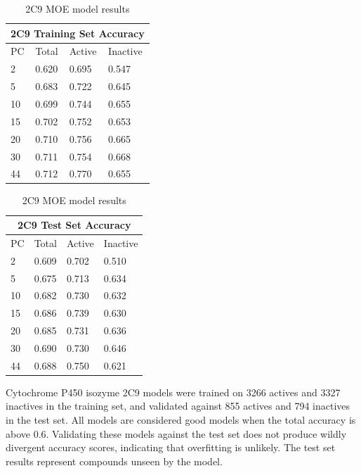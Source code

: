 \begin{table}[!h]
\begin{minipage}{.5\linewidth}
\centering
\begin{tabular}{|l|l|l|l|}
\hline
\multicolumn{4}{|c|}{2C9 Training Set Accuracy} \\ \hline
PC & Total          & Active          & Inactive\\ \hline
2  & 0.620          & 0.695           & 0.547   \\ \hline
5  & 0.683          & 0.722           & 0.645   \\ \hline
10 & 0.699          & 0.744           & 0.655   \\ \hline
15 & 0.702          & 0.752           & 0.653   \\ \hline
20 & 0.710          & 0.756           & 0.665   \\ \hline
30 & 0.711          & 0.754           & 0.668   \\ \hline
44 & 0.712          & 0.770           & 0.655   \\ \hline
\end{tabular}
\end{minipage}
\begin{minipage}{.5\linewidth}
\centering
\begin{tabular}{|l|l|l|l|}
\hline
\multicolumn{4}{|c|}{2C9 Test Set Accuracy}     \\ \hline
PC & Total          & Active          & Inactive\\ \hline
2  & 0.609          & 0.702           & 0.510   \\ \hline
5  & 0.675          & 0.713           & 0.634   \\ \hline
10 & 0.682          & 0.730           & 0.632   \\ \hline
15 & 0.686          & 0.739           & 0.630   \\ \hline
20 & 0.685          & 0.731           & 0.636   \\ \hline
30 & 0.690          & 0.730           & 0.646   \\ \hline
44 & 0.688          & 0.750           & 0.621   \\ \hline
\end{tabular}
\end{minipage}
\caption{2C9 MOE model results}
\end{table}

Cytochrome P450 isozyme 2C9 models were trained on 3266 actives and 3327 inactives in the training set, and validated against 855 actives and 794 inactives in the test set. All models are considered good models when the total accuracy is above 0.6. Validating these models against the test set does not produce wildly divergent accuracy scores, indicating that overfitting is unlikely. The test set results represent compounds unseen by the model. 

